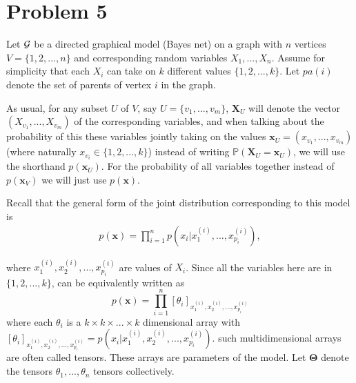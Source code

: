 \newcommand{\bXU}{\boldsymbol{X}_U}
\newcommand{\bTheta}{\boldsymbol{\Theta}}
\newpage
\section{Problem 5}
Let $\mathcal{G}$ be a directed graphical model (Bayes net) on a graph with $n$ vertices $V = \{1,2, ..., n\}$ and corresponding random variables $X_1, ..., X_n$. Assume for simplicity that each $X_i$ can take on $k$ different values $\{1, 2, ..., k\}.$ Let $pa(i)$ denote the set of parents of vertex $i$ in the graph. 

As usual, for any subset $U$ of $V$, say $U = \{v_1, ..., v_m\}$, $\bXU$ will denote the vector $(X_{v_1}, ..., X_{v_m})$ of the corresponding variables, and when talking about the probability of this these variables jointly taking on the values $\textbf{x}_U = (x_{v_1}, ..., x_{v_m})$ (where naturally $x_{v_i} \in \{1, 2, ..., k\}$) instead of writing $\mathbb{P}(\bXU = \textbf{x}_U)$, we will use the shorthand $p(\textbf{x}_U)$. For the probability of all variables together instead of $p(\textbf{x}_V)$ we will just use $p(\textbf{x})$.   

Recall that the general form of the joint distribution corresponding to this model is 
\begin{align}
    p(\textbf{x}) = \prod_{i = 1}^n p(x_i|x_1^{(i)}, ..., x_{p_i}^{(i)}),\label{P5: joint distro}
\end{align}

where $x_1^{(i)}, x_2^{(i)}, ..., x_{p_i}^{(i)}$ are values of $X_i$. Since all the variables here are in $\{1, 2, ..., k\}$, can be equivalently written as 
\[p(\textbf{x}) = \prod_{i = 1}^n[\theta_i]_{x_1^{(i)}, x_2^{(i)}, ..., x_{p_i}^{(i)}}\]
where each $\theta_i$ is a $k \times k \times ...\times k$ dimensional array with $[\theta_i]_{x_1^{(i)}, x_2^{(i)}, ..., x_{p_i}^{(i)}} = p(x_i | x_1^{(i)}, x_2^{(i)}, ..., x_{p_i}^{(i)})$. such multidimensional arrays are often called tensors. These arrays are parameters of the model. Let $\bTheta$ denote the tensors $\theta_1, ..., \theta_n$ tensors collectively. 

\newpage
